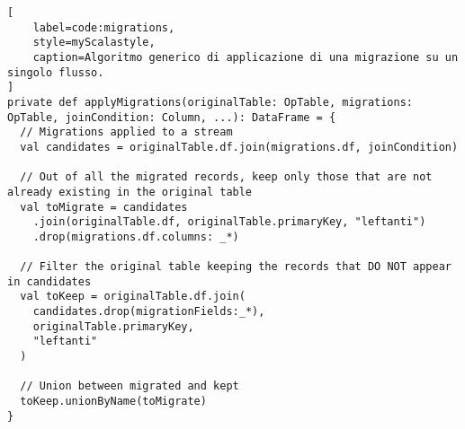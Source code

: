 \begin{lstlisting}[
    label=code:migrations,
    style=myScalastyle,
    caption=Algoritmo generico di applicazione di una migrazione su un singolo flusso.
]
private def applyMigrations(originalTable: OpTable, migrations: OpTable, joinCondition: Column, ...): DataFrame = {
  // Migrations applied to a stream
  val candidates = originalTable.df.join(migrations.df, joinCondition)

  // Out of all the migrated records, keep only those that are not already existing in the original table
  val toMigrate = candidates
    .join(originalTable.df, originalTable.primaryKey, "leftanti")
    .drop(migrations.df.columns: _*)

  // Filter the original table keeping the records that DO NOT appear in candidates
  val toKeep = originalTable.df.join(
    candidates.drop(migrationFields:_*),
    originalTable.primaryKey,
    "leftanti"
  )

  // Union between migrated and kept
  toKeep.unionByName(toMigrate)
}
\end{lstlisting}